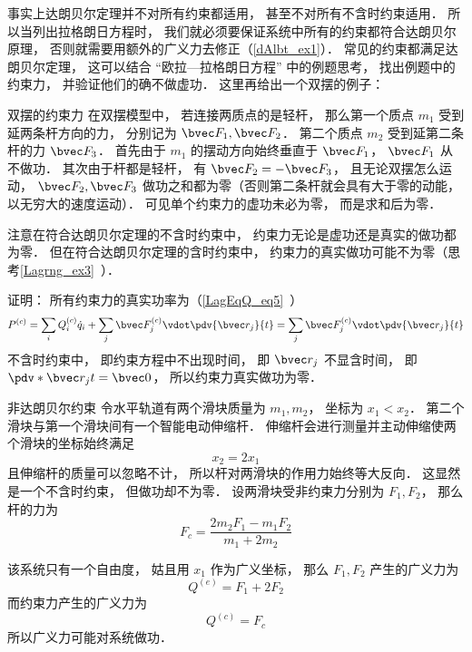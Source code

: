 事实上达朗贝尔定理并不对所有约束都适用， 甚至不对所有不含时约束适用． 所以当列出拉格朗日方程时， 我们就必须要保证系统中所有的约束都符合达朗贝尔原理， 否则就需要用额外的广义力去修正（\autoref{dAlbt_ex1}）． 常见的约束都满足达朗贝尔定理， 这可以结合 “欧拉—拉格朗日方程” 中的例题思考， 找出例题中的约束力， 并验证他们的确不做虚功． 这里再给出一个双摆的例子：

\begin{example}{双摆的约束力}
在双摆模型中， 若连接两质点的是轻杆， 那么第一个质点 $m_1$ 受到延两条杆方向的力， 分别记为 $\bvec F_1, \bvec F_2$． 第二个质点 $m_2$ 受到延第二条杆的力 $\bvec F_3$． 首先由于 $m_1$ 的摆动方向始终垂直于 $\bvec F_1$， $\bvec F_1$ 从不做功． 其次由于杆都是轻杆， 有 $\bvec F_2 = -\bvec F_3$， 且无论双摆怎么运动， $\bvec F_2, \bvec F_3$ 做功之和都为零（否则第二条杆就会具有大于零的动能， 以无穷大的速度运动）． 可见单个约束力的虚功未必为零， 而是求和后为零．
\end{example}

注意在符合达朗贝尔定理的不含时约束中， 约束力无论是虚功还是真实的做功都为零． 但在符合达朗贝尔定理的含时约束中， 约束力的真实做功可能不为零（思考\autoref{Lagrng_ex3}~）．

证明： 所有约束力的真实功率为（\autoref{LagEqQ_eq5}~）
\begin{equation}
P^{(c)} = \sum_i Q_i^{(c)} \dot q_i + \sum_j \bvec F_j^{(c)} \vdot \pdv{\bvec r_j}{t} = \sum_j \bvec F_j^{(c)} \vdot \pdv{\bvec r_j}{t}
\end{equation}
不含时约束中， 即约束方程中不出现时间， 即 $\bvec r_j$ 不显含时间， 即 $\pdv*{\bvec r_j}{t} = \bvec 0$， 所以约束力真实做功为零．

\begin{example}{非达朗贝尔约束}\label{dAlbt_ex1}
令水平轨道有两个滑块质量为 $m_1,m_2$， 坐标为 $x_1<x_2$． 第二个滑块与第一个滑块间有一个智能电动伸缩杆． 伸缩杆会进行测量并主动伸缩使两个滑块的坐标始终满足
\begin{equation}
x_2 = 2x_1
\end{equation}
且伸缩杆的质量可以忽略不计， 所以杆对两滑块的作用力始终等大反向． 这显然是一个不含时约束， 但做功却不为零． 设两滑块受非约束力分别为 $F_1,F_2$， 那么杆的力为
\begin{equation}
F_c = \frac{2m_2F_1 - m_1F_2}{m_1+2m_2}
\end{equation}

该系统只有一个自由度， 姑且用 $x_1$ 作为广义坐标， 那么 $F_1,F_2$ 产生的广义力为
\begin{equation}
Q^{(e)} = F_1 + 2F_2
\end{equation}
而约束力产生的广义力为
\begin{equation}
Q^{(c)} = F_c
\end{equation}
所以广义力可能对系统做功．
\end{example}
